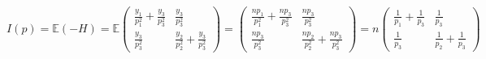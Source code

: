 \documentclass[12pt,letterpaper]{article}
\newcommand{\E}{\mathbb{E}}
\begin{document}
\begin{enumerate} [a)]
{\begin{enumerate} [1.]
{                $$I(p) = \E(-H) = \E
                \begin{pmatrix}
                    \frac{y_1}{p_1^2} + \frac{y_3}{p_3^2} & \frac{y_3}{p_3^2} \\
                    \frac{y_3}{p_3^2} & \frac{y_2}{p_2^2} + \frac{y_3}{p_3^2}
                \end{pmatrix} =
                \begin{pmatrix}
                    \frac{np_1}{p_1^2} + \frac{np_3}{p_3^2} & \frac{np_3}{p_3^2} \\
                    \frac{np_3}{p_3^2} & \frac{np_2}{p_2^2} + \frac{np_3}{p_3^2}
                \end{pmatrix} = n
                \begin{pmatrix}
                    \frac{1}{p_1} + \frac{1}{p_3} & \frac{1}{p_3} \\
                    \frac{1}{p_3} & \frac{1}{p_2} + \frac{1}{p_3}
                \end{pmatrix}
                $$
                
}
\end{enumerate}}
\end{enumerate}
\end{document}
